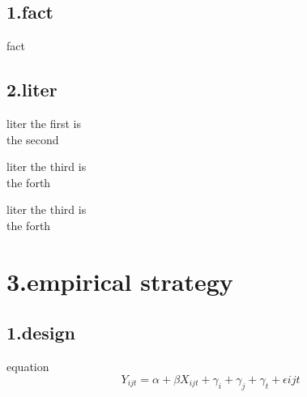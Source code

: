 \documentclass[compress]{beamer}
\begin{document}
	
	
	\subsection{1.fact}
	\begin{frame}{fact}
	\end{frame}
	
	
	
	
	\subsection{2.liter}
	\begin{frame}{liter}
		the first is \\
		the second
	\end{frame}
	
	\begin{frame}{liter}
		the third is \\
		the forth
	\end{frame}
	
	\begin{frame}{liter}
		the third is \\
		the forth
	\end{frame}
	
	
	
	\section{3.empirical strategy}
	
	\subsection{1.design}
	\begin{frame}{equation}
		$$Y_{ijt}=\alpha + \beta X_{ijt} + \gamma_{i} +\gamma_{j} +\gamma_{t} +\epsilon{ijt} $$
	\end{frame}
	
\end{document}
